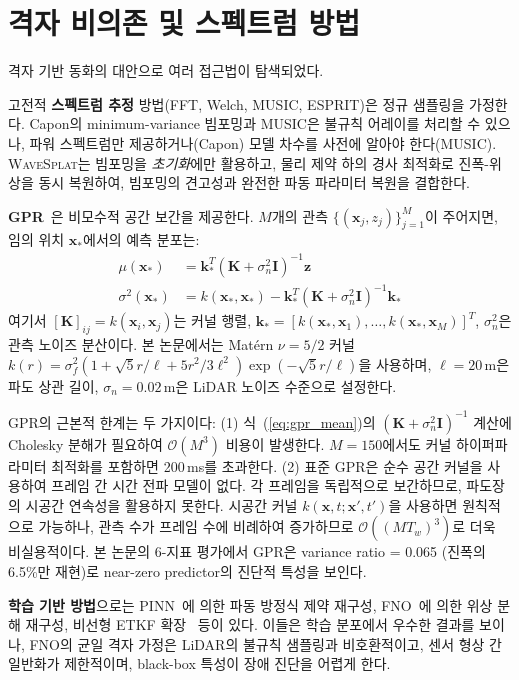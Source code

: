 \documentclass[11pt]{report}
\numberwithin{equation}{chapter}
\numberwithin{figure}{chapter}
\numberwithin{table}{chapter}
\newcommand{\WS}{\textsc{WaveSplat}}
\begin{document}
\section{격자 비의존 및 스펙트럼 방법}
\label{sec:gridfree_methods}

격자 기반 동화의 대안으로 여러 접근법이 탐색되었다.

고전적 \textbf{스펙트럼 추정} 방법(FFT, Welch, MUSIC, ESPRIT)은
정규 샘플링을 가정한다. Capon의 minimum-variance 빔포밍과
MUSIC은 불규칙 어레이를 처리할 수 있으나, 파워 스펙트럼만 제공하거나(Capon)
모델 차수를 사전에 알아야 한다(MUSIC).
\WS{}는 빔포밍을 \emph{초기화}에만 활용하고, 물리 제약 하의 경사 최적화로
진폭-위상을 동시 복원하여, 빔포밍의 견고성과 완전한 파동 파라미터 복원을 결합한다.

\textbf{GPR}~\citep{RasmussenWilliams2006}은 비모수적 공간 보간을 제공한다.
$M$개의 관측 $\{(\mathbf{x}_j, z_j)\}_{j=1}^{M}$이 주어지면,
임의 위치 $\mathbf{x}_*$에서의 예측 분포는:
\begin{align}
  \mu(\mathbf{x}_*) &= \mathbf{k}_*^T (\mathbf{K} + \sigma_n^2 \mathbf{I})^{-1} \mathbf{z}
  \label{eq:gpr_mean} \\
  \sigma^2(\mathbf{x}_*) &= k(\mathbf{x}_*, \mathbf{x}_*)
    - \mathbf{k}_*^T (\mathbf{K} + \sigma_n^2 \mathbf{I})^{-1} \mathbf{k}_*
  \label{eq:gpr_var}
\end{align}
여기서 $[\mathbf{K}]_{ij} = k(\mathbf{x}_i, \mathbf{x}_j)$는 커널 행렬,
$\mathbf{k}_* = [k(\mathbf{x}_*, \mathbf{x}_1), \ldots, k(\mathbf{x}_*, \mathbf{x}_M)]^T$,
$\sigma_n^2$은 관측 노이즈 분산이다.
본 논문에서는 Mat\'{e}rn $\nu = 5/2$ 커널
$k(r) = \sigma_f^2 (1 + \sqrt{5}r/\ell + 5r^2/3\ell^2) \exp(-\sqrt{5}r/\ell)$을
사용하며, $\ell = 20$\,m은 파도 상관 길이, $\sigma_n = 0.02$\,m은
LiDAR 노이즈 수준으로 설정한다.

GPR의 근본적 한계는 두 가지이다:
(1) 식~(\ref{eq:gpr_mean})의 $(\mathbf{K} + \sigma_n^2\mathbf{I})^{-1}$
계산에 Cholesky 분해가 필요하여 $\mathcal{O}(M^3)$ 비용이 발생한다.
$M = 150$에서도 커널 하이퍼파라미터 최적화를 포함하면 200\,ms를 초과한다.
(2) 표준 GPR은 순수 공간 커널을 사용하여 프레임 간 시간 전파 모델이 없다.
각 프레임을 독립적으로 보간하므로, 파도장의 시공간 연속성을 활용하지 못한다.
시공간 커널 $k(\mathbf{x}, t; \mathbf{x}', t')$을 사용하면 원칙적으로 가능하나,
관측 수가 프레임 수에 비례하여 증가하므로 $\mathcal{O}((MT_w)^3)$로 더욱 비실용적이다.
본 논문의 6-지표 평가에서 GPR은 variance ratio = 0.065 (진폭의 6.5\%만 재현)로
near-zero predictor의 진단적 특성을 보인다.

\textbf{학습 기반 방법}으로는 PINN~\citep{Liu2024}에 의한 파동 방정식
제약 재구성, FNO~\citep{Ehlers2024}에 의한 위상 분해 재구성,
비선형 ETKF 확장~\citep{Desmars2023} 등이 있다.
이들은 학습 분포에서 우수한 결과를 보이나,
FNO의 균일 격자 가정은 LiDAR의 불규칙 샘플링과 비호환적이고,
센서 형상 간 일반화가 제한적이며, black-box 특성이 장애 진단을 어렵게 한다.
\end{document}
